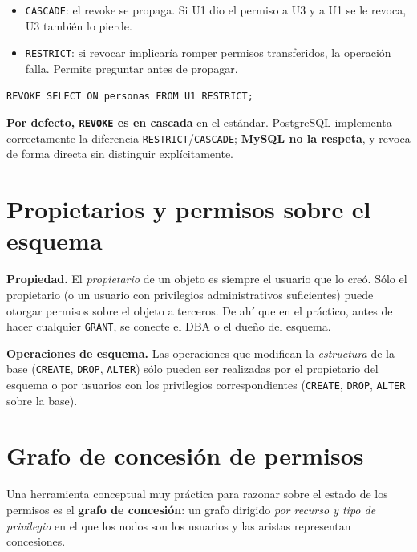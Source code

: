 \documentclass[11pt,a4paper]{article}
\begin{document}
\begin{itemize}
    \item \texttt{CASCADE}: el revoke se propaga. Si U1 dio el permiso
    a U3 y a U1 se le revoca, U3 también lo pierde.
    \item \texttt{RESTRICT}: si revocar implicaría romper permisos
    transferidos, la operación falla. Permite preguntar antes de
    propagar.
\end{itemize}

\begin{lstlisting}
REVOKE SELECT ON personas FROM U1 RESTRICT;
\end{lstlisting}

\begin{nota}
\textbf{Por defecto, \texttt{REVOKE} es en cascada} en el estándar.
PostgreSQL implementa correctamente la diferencia
\texttt{RESTRICT}/\texttt{CASCADE}; \textbf{MySQL no la respeta}, y
revoca de forma directa sin distinguir explícitamente.
\end{nota}

\section{Propietarios y permisos sobre el esquema}

\textbf{Propiedad.} El \emph{propietario} de un objeto es siempre el
usuario que lo creó. Sólo el propietario (o un usuario con privilegios
administrativos suficientes) puede otorgar permisos sobre el objeto a
terceros. De ahí que en el práctico, antes de hacer cualquier
\texttt{GRANT}, se conecte el DBA o el dueño del esquema.

\textbf{Operaciones de esquema.} Las operaciones que modifican la
\emph{estructura} de la base (\texttt{CREATE}, \texttt{DROP},
\texttt{ALTER}) sólo pueden ser realizadas por el propietario del
esquema o por usuarios con los privilegios correspondientes
(\texttt{CREATE}, \texttt{DROP}, \texttt{ALTER} sobre la base).

\section{Grafo de concesión de permisos}

Una herramienta conceptual muy práctica para razonar sobre el estado
de los permisos es el \textbf{grafo de concesión}: un grafo dirigido
\emph{por recurso y tipo de privilegio} en el que los nodos son los
usuarios y las aristas representan concesiones.
\end{document}
